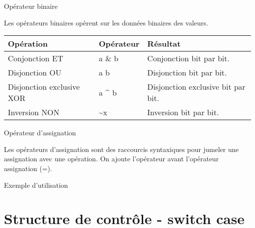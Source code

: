 \begin{frame}{Opérateur binaire}
\protect\hypertarget{opuxe9rateur-binaire}{}

Les opérateurs binaires opèrent sur les données binaires des valeurs.

\begin{longtable}[]{@{}lll@{}}
\toprule
Opération & Opérateur & Résultat\tabularnewline
\midrule
\endhead
Conjonction ET & a \& b & Conjonction bit par bit.\tabularnewline
Disjonction OU & a \textbar{} b & Disjonction bit par
bit.\tabularnewline
Disjonction exclusive XOR & a \^{} b & Disjonction exclusive bit par
bit.\tabularnewline
Inversion NON & \textasciitilde{}x & Inversion bit par
bit.\tabularnewline
\bottomrule
\end{longtable}

\end{frame}

\begin{frame}[fragile]{Opérateur d'assignation}
\protect\hypertarget{opuxe9rateur-dassignation}{}

Les opérateurs d'assignation sont des raccourcis syntaxiques pour
jumeler une assignation avec une opération. On ajoute l'opérateur avant
l'opérateur assignation (=).

Exemple d'utilisation

\begin{Shaded}
\end{Shaded}

\end{frame}

\hypertarget{structure-de-contruxf4le---switch-case}{%
\section{Structure de contrôle - switch
case}\label{structure-de-contruxf4le---switch-case}}

